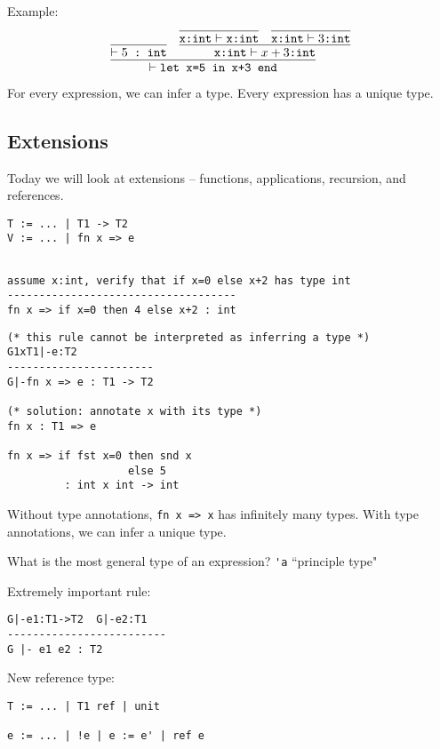 \documentclass[11pt]{article}
\begin{document}
Example:
\[
    \infer{ \vdash \verb~let x=5 in x+3 end~}{
        \infer{\vdash 5 \verb~ : int~}{}
        &
        \infer{\verb~x:int~ \vdash x+3 \verb~:int~}{
            \infer{\verb~x:int~\vdash \verb~x:int~}{}
            &
            \infer{\verb~x:int~ \vdash 3 \verb~:int~}{}
        }
    }
\]

For every expression, we can infer a type. Every expression has a unique type.

\subsection{Extensions}
Today we will look at extensions -- functions, applications, recursion, and references. 

\begin{verbatim}
T := ... | T1 -> T2
V := ... | fn x => e
\end{verbatim}

\begin{verbatim}

assume x:int, verify that if x=0 else x+2 has type int
------------------------------------
fn x => if x=0 then 4 else x+2 : int
\end{verbatim}

\begin{verbatim}
(* this rule cannot be interpreted as inferring a type *)
G1xT1|-e:T2
-----------------------
G|-fn x => e : T1 -> T2

(* solution: annotate x with its type *)
fn x : T1 => e

fn x => if fst x=0 then snd x
                   else 5
         : int x int -> int
\end{verbatim}

Without type annotations, \verb~fn x => x~ has infinitely many types. With type annotations, we can infer a unique type.

What is the most general type of an expression? \verb~'a~ ``principle type"

Extremely important rule:
\begin{verbatim}
G|-e1:T1->T2  G|-e2:T1
-------------------------
G |- e1 e2 : T2
\end{verbatim}

New reference type:
\begin{verbatim}
T := ... | T1 ref | unit

e := ... | !e | e := e' | ref e
\end{verbatim}
\end{document}
